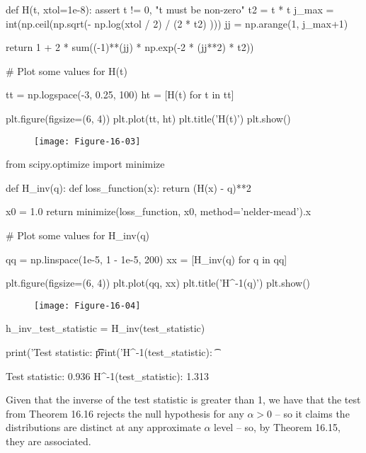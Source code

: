 \begin{python}
def H(t, xtol=1e-8):
    assert t != 0, "t must be non-zero"
    t2 = t * t
    j_max = int(np.ceil(np.sqrt(- np.log(xtol / 2) / (2 * t2) )))
    jj = np.arange(1, j_max+1)

    return 1 + 2 * sum((-1)**(jj) * np.exp(-2 * (jj**2) * t2))
\end{python}

\begin{python}
# Plot some values for H(t)

tt = np.logspace(-3, 0.25, 100)
ht = [H(t) for t in tt]

plt.figure(figsize=(6, 4))
plt.plot(tt, ht)
plt.title('H(t)')
plt.show()
\end{python}

\begin{figure}[H]
\centering
\texttt{[image: Figure-16-03]}
\end{figure}

\begin{python}
from scipy.optimize import minimize

def H_inv(q):
    def loss_function(x):
        return (H(x) - q)**2
    
    x0 = 1.0
    return minimize(loss_function, x0, method='nelder-mead').x
\end{python}

\begin{python}
# Plot some values for H_inv(q)

qq = np.linspace(1e-5, 1 - 1e-5, 200)
xx = [H_inv(q) for q in qq]

plt.figure(figsize=(6, 4))
plt.plot(qq, xx)
plt.title('H^{-1}(q)')
plt.show()
\end{python}

\begin{figure}[H]
\centering
\texttt{[image: Figure-16-04]}
\end{figure}

\begin{python}
h_inv_test_statistic = H_inv(test_statistic)

print('Test statistic: \t\t%
print('H^{-1}(test_statistic): \t%
\end{python}

\begin{console}
Test statistic:                 0.936
H^{-1}(test\_statistic):         1.313
\end{console}

Given that the inverse of the test statistic is greater than 1, we have
that the test from Theorem 16.16 rejects the null hypothesis for any
\(\alpha > 0\) -- so it claims the distributions are distinct at any
approximate \(\alpha\) level -- so, by Theorem 16.15, they are
associated.
